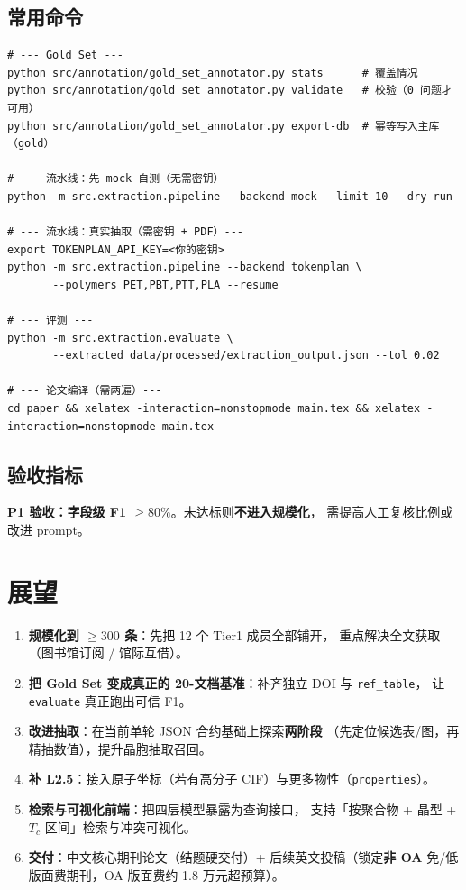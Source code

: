 \documentclass[11pt,a4paper]{ctexart}
\begin{document}
\subsection{常用命令}
\begin{lstlisting}[style=common]
# --- Gold Set ---
python src/annotation/gold_set_annotator.py stats      # 覆盖情况
python src/annotation/gold_set_annotator.py validate   # 校验（0 问题才可用）
python src/annotation/gold_set_annotator.py export-db  # 幂等写入主库（gold）

# --- 流水线：先 mock 自测（无需密钥）---
python -m src.extraction.pipeline --backend mock --limit 10 --dry-run

# --- 流水线：真实抽取（需密钥 + PDF）---
export TOKENPLAN_API_KEY=<你的密钥>
python -m src.extraction.pipeline --backend tokenplan \
       --polymers PET,PBT,PTT,PLA --resume

# --- 评测 ---
python -m src.extraction.evaluate \
       --extracted data/processed/extraction_output.json --tol 0.02

# --- 论文编译（需两遍）---
cd paper && xelatex -interaction=nonstopmode main.tex && xelatex -interaction=nonstopmode main.tex
\end{lstlisting}

\subsection{验收指标}
\textbf{P1 验收：字段级 F1 $\ge 80\%$}。未达标则\textbf{不进入规模化}，
需提高人工复核比例或改进 prompt。

\section{展望}

\begin{enumerate}[leftmargin=1.6em]
  \item \textbf{规模化到 $\ge 300$ 条}：先把 12 个 Tier1 成员全部铺开，
        重点解决全文获取（图书馆订阅 / 馆际互借）。
  \item \textbf{把 Gold Set 变成真正的 20-文档基准}：补齐独立 DOI 与 \texttt{ref\_table}，
        让 \texttt{evaluate} 真正跑出可信 F1。
  \item \textbf{改进抽取}：在当前单轮 JSON 合约基础上探索\textbf{两阶段}
        （先定位候选表/图，再精抽数值），提升晶胞抽取召回。
  \item \textbf{补 L2.5}：接入原子坐标（若有高分子 CIF）与更多物性（\texttt{properties}）。
  \item \textbf{检索与可视化前端}：把四层模型暴露为查询接口，
        支持「按聚合物 + 晶型 + $T_c$ 区间」检索与冲突可视化。
  \item \textbf{交付}：中文核心期刊论文（结题硬交付）+
        后续英文投稿（锁定\textbf{非 OA} 免/低版面费期刊，OA 版面费约 1.8 万元超预算）。
\end{enumerate}
\end{document}
